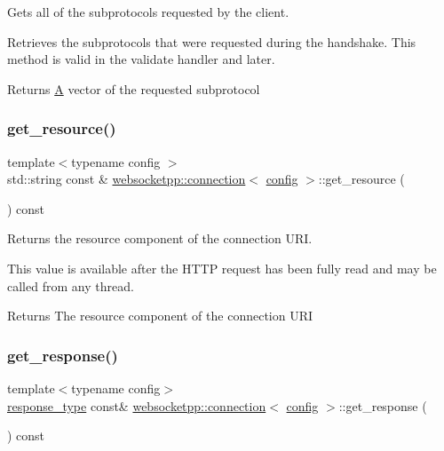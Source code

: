 Gets all of the subprotocols requested by the client. 

Retrieves the subprotocols that were requested during the handshake. This method is valid in the validate handler and later.

\begin{DoxyReturn}{Returns}
\mbox{\hyperlink{struct_a}{A}} vector of the requested subprotocol 
\end{DoxyReturn}
\mbox{\label{classwebsocketpp_1_1connection_a52ad47e67e1327e95d1572e04173a409}} 
\subsubsection{\texorpdfstring{get\+\_\+resource()}{get\_resource()}}
{\footnotesize\ttfamily template$<$typename config $>$ \\
std\+::string const  \& \mbox{\hyperlink{classwebsocketpp_1_1connection}{websocketpp\+::connection}}$<$ \mbox{\hyperlink{classconfig}{config}} $>$\+::get\+\_\+resource (\begin{DoxyParamCaption}{ }\end{DoxyParamCaption}) const}



Returns the resource component of the connection U\+RI. 

This value is available after the H\+T\+TP request has been fully read and may be called from any thread.

\begin{DoxyReturn}{Returns}
The resource component of the connection U\+RI 
\end{DoxyReturn}
\mbox{\label{classwebsocketpp_1_1connection_afe112802e0cce33907f513bb9e0cce19}} 
\subsubsection{\texorpdfstring{get\+\_\+response()}{get\_response()}}
{\footnotesize\ttfamily template$<$typename config$>$ \\
\mbox{\hyperlink{classwebsocketpp_1_1http_1_1parser_1_1response}{response\+\_\+type}} const\& \mbox{\hyperlink{classwebsocketpp_1_1connection}{websocketpp\+::connection}}$<$ \mbox{\hyperlink{classconfig}{config}} $>$\+::get\+\_\+response (\begin{DoxyParamCaption}{ }\end{DoxyParamCaption}) const\hspace{0.3cm}{\ttfamily [inline]}}



